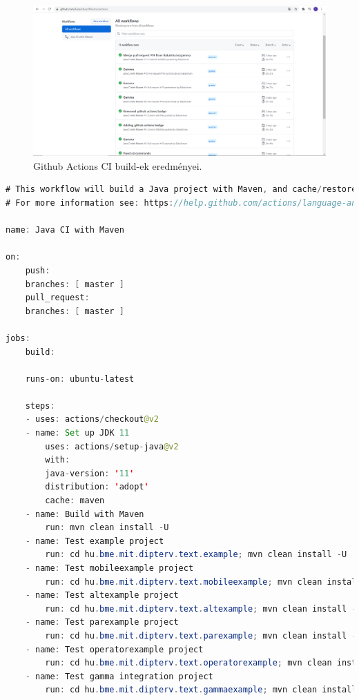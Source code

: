 \begin{figure}[!ht]
    \centering
    \includegraphics[width=150mm, keepaspectratio]{figures/github_ci_builds.png}
    \caption{Github Actions CI build-ek eredményei.}
\end{figure}

\begin{lstlisting}[language=java, frame=single, float=ht!, caption={Github Actions CI-hoz tartozó .yml script.},captionpos=b]
# This workflow will build a Java project with Maven, and cache/restore any dependencies to improve the workflow execution time
# For more information see: https://help.github.com/actions/language-and-framework-guides/building-and-testing-java-with-maven

name: Java CI with Maven

on:
    push:
    branches: [ master ]
    pull_request:
    branches: [ master ]

jobs:
    build:

    runs-on: ubuntu-latest

    steps:
    - uses: actions/checkout@v2
    - name: Set up JDK 11
        uses: actions/setup-java@v2
        with:
        java-version: '11'
        distribution: 'adopt'
        cache: maven
    - name: Build with Maven
        run: mvn clean install -U
    - name: Test example project
        run: cd hu.bme.mit.dipterv.text.example; mvn clean install -U
    - name: Test mobileexample project
        run: cd hu.bme.mit.dipterv.text.mobileexample; mvn clean install -U
    - name: Test altexample project
        run: cd hu.bme.mit.dipterv.text.altexample; mvn clean install -U
    - name: Test parexample project
        run: cd hu.bme.mit.dipterv.text.parexample; mvn clean install -U
    - name: Test operatorexample project
        run: cd hu.bme.mit.dipterv.text.operatorexample; mvn clean install -U
    - name: Test gamma integration project
        run: cd hu.bme.mit.dipterv.text.gammaexample; mvn clean install -U
\end{lstlisting}

